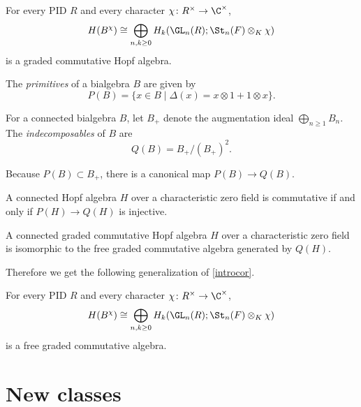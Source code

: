 \begin{theorem}\label{hopfalg}
For every PID $R$ and every character $\chi\colon R^\times \to \C^\times$, 
\[ H(B^\chi) \cong \bigoplus_{n,k\ge0} H_k(\GL_n(R); \St_n(F) \otimes_K \chi)\]
is a graded commutative Hopf algebra.
\end{theorem}

The \emph{primitives} of a bialgebra $B$ are given by
\[ P(B) = \{ x \in B \mid \Delta(x) = x \otimes 1 + 1 \otimes x \}.\]

For a connected bialgebra $B$, let $B_+$ denote the augmentation ideal $\bigoplus_{n\ge 1} B_n$. The \emph{indecomposables} of $B$ are
\[ Q(B) = B_+/(B_+)^2.\]

Because $P(B) \subset B_+$, there is a canonical map $P(B) \to Q(B)$.

\begin{proposition}\label{inj}
A connected Hopf algebra $H$ over a characteristic zero field is commutative if and only if $P(H) \to Q(H)$ is injective.
\end{proposition}

\begin{theorem}\label{Leray}
A connected graded commutative Hopf algebra $H$ over a characteristic zero field is isomorphic to the free graded commutative algebra generated by $Q(H)$. 
\end{theorem}

Therefore we get the following generalization of \autoref{introcor}.

\begin{corollary}
For every PID $R$ and every character $\chi\colon R^\times \to \C^\times$, 
\[ H(B^\chi) \cong \bigoplus_{n,k\ge0} H_k(\GL_n(R); \St_n(F) \otimes_K \chi)\]
is a free graded commutative algebra.
\end{corollary}





\section{New classes}

